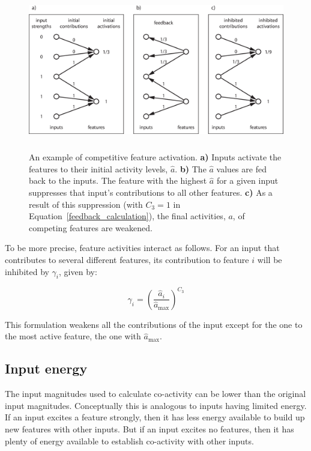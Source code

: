 \begin{figure}
\centering
\includegraphics[height=7cm]{figs/competitive_activation.eps}
\caption{An example of competitive feature activation. {\bf a)} Inputs activate the features to their initial activity levels, $\hat{a}$. {\bf b)} The $\hat{a}$ values are fed back to the inputs. The feature with the highest $\hat{a}$ for a given input suppresses that input's contributions to all other features. {\bf c)} As a result of this suppression (with $C_3 = 1$ in Equation~\ref{feedback_calculation}), the final activities, $a$, of competing features are weakened.}
\label{competitive_activation}
\end{figure}

To be more precise, feature activities interact as follows. For an input that contributes to several different features, its contribution to feature $i$ will be inhibited by $\gamma_i$, given by:

\begin{equation}
\gamma_i = \left( \frac{\hat{a}_i}{\hat{a}_{\max}}\right ) ^ {C_3}
\label{feedback_calculation}
\end{equation}

This formulation weakens all the contributions of the input except for the one to the most active feature, the one with $\hat{a}_{\max}$.

\subsection{Input energy}

The input magnitudes used to calculate co-activity can be lower than the original input magnitudes. Conceptually this is analogous to inputs having limited energy. If an input excites a feature strongly, then it has less energy available to build up new features with other inputs. But if an input excites no features, then it has plenty of energy available to establish co-activity with other inputs.

